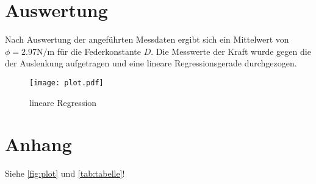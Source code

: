 %

%
\section{Auswertung}
\label{sec:Auswertung}

Nach Auswertung der angeführten Messdaten ergibt sich ein Mittelwert von $\phi = 2.97 \unit{\newton \per \meter}$ für
die Federkonstante $D$.
Die Messwerte der Kraft wurde gegen die der Auslenkung aufgetragen und eine lineare Regressionsgerade durchgezogen.
\begin{figure}
  \centering
  \texttt{[image: plot.pdf]}
  \caption{lineare Regression}
  \label{fig:plot}
\end{figure}




\section{Anhang}
Siehe \autoref{fig:plot} und \autoref{tab:tabelle}!

%
